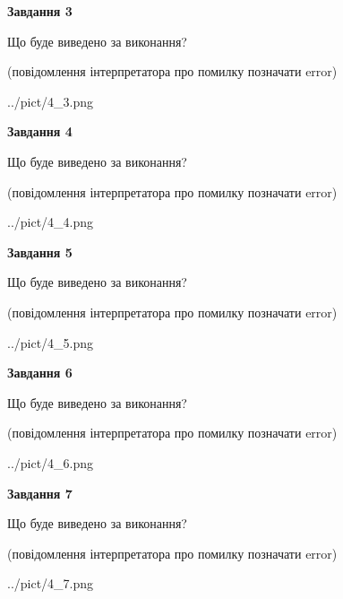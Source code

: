 \documentclass[12pt, ukrainian]{article}
\begin{document}
{\begin {large}
{\begin {center}\textbf{Завдання 3}\end {center}}\par
Що буде виведено за виконання?\par
 (повідомлення інтерпретатора про помилку позначати error)\par
\begin{center}
	{../pict/4_3.png}
\end{center}
\newpage

{\begin {center}\textbf{Завдання 4}\end {center}}\par
Що буде виведено за виконання?\par
 (повідомлення інтерпретатора про помилку позначати error)\par
\begin{center}
	{../pict/4_4.png}
\end{center}
\newpage

{\begin {center}\textbf{Завдання 5}\end {center}}\par
Що буде виведено за виконання?\par
 (повідомлення інтерпретатора про помилку позначати error)\par
\begin{center}
	{../pict/4_5.png}
\end{center}
\newpage

{\begin {center}\textbf{Завдання 6}\end {center}}\par
Що буде виведено за виконання?\par
 (повідомлення інтерпретатора про помилку позначати error)\par
\begin{center}
	{../pict/4_6.png}
\end{center}
\newpage

{\begin {center}\textbf{Завдання 7}\end {center}}\par
Що буде виведено за виконання?\par
 (повідомлення інтерпретатора про помилку позначати error)\par
\begin{center}
	{../pict/4_7.png}
\end{center}
\newpage


\end{large}}
\end{document}
